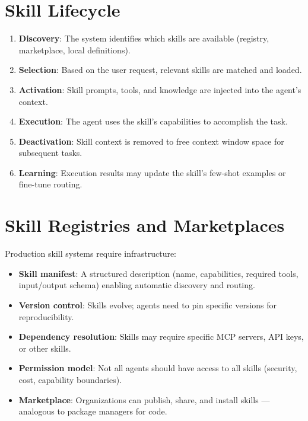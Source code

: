 \section{Skill Lifecycle}
\label{skill-lifecycle}

\begin{enumerate}
  \item \textbf{Discovery}: The system identifies which skills are available (registry, marketplace, local definitions).
  \item \textbf{Selection}: Based on the user request, relevant skills are matched and loaded.
  \item \textbf{Activation}: Skill prompts, tools, and knowledge are injected into the agent’s context.
  \item \textbf{Execution}: The agent uses the skill’s capabilities to accomplish the task.
  \item \textbf{Deactivation}: Skill context is removed to free context window space for subsequent tasks.
  \item \textbf{Learning}: Execution results may update the skill’s few-shot examples or fine-tune routing.
\end{enumerate}

\section{Skill Registries and Marketplaces}
\label{skill-registries-and-marketplaces}

Production skill systems require infrastructure:

\begin{itemize}
  \item \textbf{Skill manifest}: A structured description (name, capabilities, required tools, input/output schema) enabling automatic discovery and routing.
  \item \textbf{Version control}: Skills evolve; agents need to pin specific versions for reproducibility.
  \item \textbf{Dependency resolution}: Skills may require specific MCP servers, API keys, or other skills.
  \item \textbf{Permission model}: Not all agents should have access to all skills (security, cost, capability boundaries).
  \item \textbf{Marketplace}: Organizations can publish, share, and install skills --- analogous to package managers for code.
\end{itemize}

